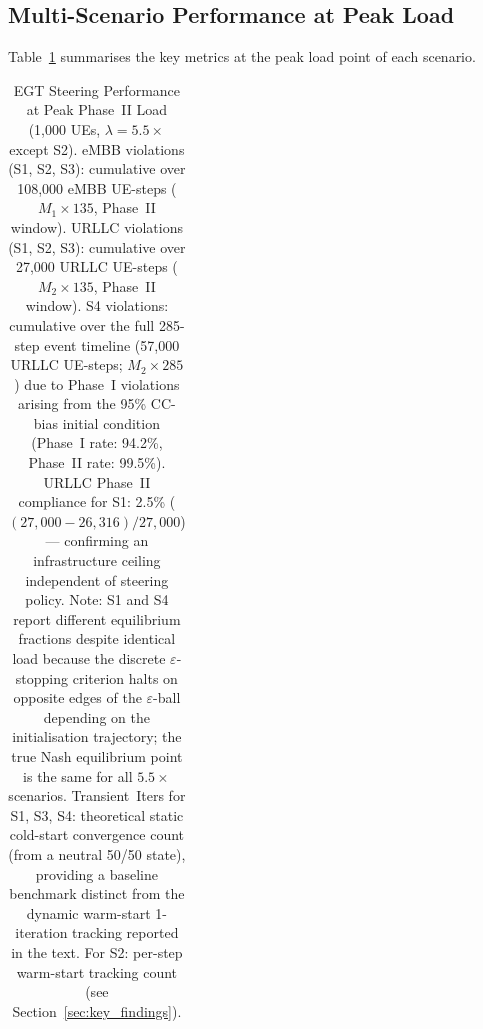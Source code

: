 \documentclass[conference]{IEEEtran}
\begin{document}
\subsection{Multi-Scenario Performance at Peak Load}

Table~\ref{tab:stadium_results} summarises the key metrics
at the peak load point of each scenario.

\begin{table}[t]
\centering
\caption{EGT Steering Performance at Peak Phase~II Load (1,000 UEs,
         $\lambda=5.5\times$ except S2).
         eMBB violations (S1, S2, S3): cumulative over 108,000 eMBB UE-steps
         ($M_1 \times 135$, Phase~II window).
         URLLC violations (S1, S2, S3): cumulative over 27,000 URLLC UE-steps
         ($M_2 \times 135$, Phase~II window).
         S4 violations: cumulative over the full 285-step event timeline
         (57,000 URLLC UE-steps; $M_2 \times 285$) due to Phase~I
         violations arising from the 95\% CC-bias initial condition
         (Phase~I rate: 94.2\%, Phase~II rate: 99.5\%).
         URLLC Phase~II compliance for S1: 2.5\%
         ($(27{,}000 - 26{,}316)/27{,}000$) --- confirming
         an infrastructure ceiling independent of steering policy.
         Note: S1 and S4 report different equilibrium fractions
         despite identical load because the discrete $\varepsilon$-stopping
         criterion halts on opposite edges of the $\varepsilon$-ball depending
         on the initialisation trajectory; the true Nash equilibrium point
         is the same for all $5.5\times$ scenarios.
         Transient~Iters for S1, S3, S4: theoretical static cold-start convergence
         count (from a neutral 50/50 state), providing a baseline benchmark distinct
         from the dynamic warm-start 1-iteration tracking reported in the text.
         For S2: per-step warm-start tracking count
         (see Section~\ref{sec:key_findings}).}
\label{tab:stadium_results}
\renewcommand{\arraystretch}{1.15}
\begin{tabular}{lccccccc}

\end{tabular}
\end{table}
\end{document}
